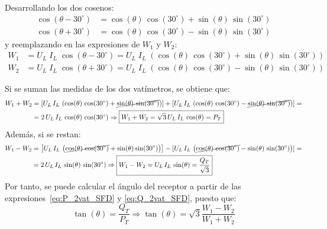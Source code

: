 	Desarrollando los dos cosenos:
\begin{align*}
  \cos(\theta-{30^\circ}) &= \cos(\theta)\,\cos({30^\circ}) + \sin(\theta)\,\sin({30^\circ})\\
  \cos(\theta+{30^\circ}) &= \cos(\theta)\,\cos({30^\circ}) - \sin(\theta)\,\sin({30^\circ})
\end{align*}
y reemplazando en las expresiones de $W_1$ y $W_2$:
\begin{align*}
    W_1&=U_L\;I_L\;\cos{(\theta-30^\circ)}=U_L\;I_L\;\left( \cos(\theta)\,\cos({30^\circ}) + \sin(\theta)\,\sin({30^\circ})\right)\\
    W_2&=U_L\;I_L\;\cos{(\theta+30^\circ)}=U_L\;I_L\;\left( \cos(\theta)\,\cos({30^\circ}) - \sin(\theta)\,\sin({30^\circ})\right)
\end{align*}

Si se suman las medidas de los dos vatímetros, se obtiene que:
\begin{align}\label{eq:P_2vat_SFD}
    W_1+W_2&=\left[ U_L\,I_L\,\left( \cos(\theta)\,\cos({30^\circ}) + \cancel{\sin(\theta)\,\sin({30^\circ})}\right) \right] + [U_L\,I_L\,\left( \cos(\theta)\,\cos({30^\circ}) - \cancel{\sin(\theta)\,\sin({30^\circ})}\right) ]=\nonumber\\
    &=2\,U_L\,I_L\,\cos(\theta)\,\cos({30^\circ}) \Rightarrow \boxed{W_1 + W_2 = \sqrt{3}\,U_L\, I_L\,\cos(\theta) = P_T}
\end{align}
Además, si se restan: 
\begin{align}\label{eq:Q_2vat_SFD}
    W_1-W_2&=\left[U_L\,I_L\,\left( \cancel{\cos(\theta)\,\cos({30^\circ})} + \sin(\theta)\sin({30^\circ})\right)\right] - [U_L\,I_L\,\left( \cancel{\cos(\theta)\,\cos({30^\circ})} - \sin(\theta)\,\sin({30^\circ})\right) ]=\nonumber\\
    &=2\,U_L\,I_L\,\sin(\theta)\,\sin({30^\circ}) \Rightarrow \boxed{W_1 - W_2 = U_L\, I_L\,\sin(\theta) = \frac{Q_T}{\sqrt{3}}}
\end{align}
Por tanto, se puede calcular el ángulo del receptor a partir de las expresiones~\eqref{eq:P_2vat_SFD} y \eqref{eq:Q_2vat_SFD}, puesto que:
\begin{equation}
    \tan(\theta) = \dfrac{Q_T}{P_T}\Rightarrow \boxed{\tan(\theta) = \sqrt{3} \frac{W_1 - W_2}{W_1 + W_2}}
\end{equation}


